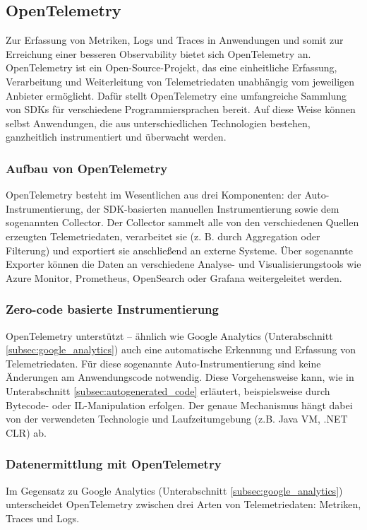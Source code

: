 \subsection{OpenTelemetry}
\label{subsec:open_telemetry}
Zur Erfassung von Metriken, Logs und Traces in Anwendungen und somit zur Erreichung einer besseren Observability bietet sich OpenTelemetry \cite{opentelemetry_what_is} an. OpenTelemetry ist ein Open-Source-Projekt, das eine einheitliche Erfassung, Verarbeitung und Weiterleitung von Telemetriedaten unabhängig vom jeweiligen Anbieter ermöglicht. Dafür stellt OpenTelemetry eine umfangreiche Sammlung von SDKs für verschiedene Programmiersprachen bereit. Auf diese Weise können selbst Anwendungen, die aus unterschiedlichen Technologien bestehen, ganzheitlich instrumentiert und überwacht werden.

\subsubsection{Aufbau von OpenTelemetry}
OpenTelemetry besteht im Wesentlichen aus drei Komponenten: der Auto-Instrumentierung, der SDK-basierten manuellen Instrumentierung sowie dem sogenannten Collector. Der Collector sammelt alle von den verschiedenen Quellen erzeugten Telemetriedaten, verarbeitet sie (z. B. durch Aggregation oder Filterung) und exportiert sie anschließend an externe Systeme. Über sogenannte Exporter können die Daten an verschiedene Analyse- und Visualisierungstools wie Azure Monitor, Prometheus, OpenSearch oder Grafana weitergeleitet werden.

\subsubsection{Zero-code basierte Instrumentierung}
OpenTelemetry unterstützt – ähnlich wie Google Analytics (Unterabschnitt \ref{subsec:google_analytics}) auch eine automatische Erkennung und Erfassung von Telemetriedaten. Für diese sogenannte {Auto-Instrumentierung} sind keine Änderungen am Anwendungscode notwendig. Diese Vorgehensweise kann, wie in Unterabschnitt \ref{subsec:autogenerated_code} erläutert, beispielsweise durch Bytecode- oder IL-Manipulation erfolgen. Der genaue Mechanismus hängt dabei von der verwendeten Technologie und Laufzeitumgebung (z.B. Java VM, .NET CLR) ab.

\subsubsection{Datenermittlung mit OpenTelemetry}
Im Gegensatz zu Google Analytics (Unterabschnitt \ref{subsec:google_analytics}) unterscheidet OpenTelemetry zwischen drei Arten von Telemetriedaten: Metriken, Traces und Logs.

